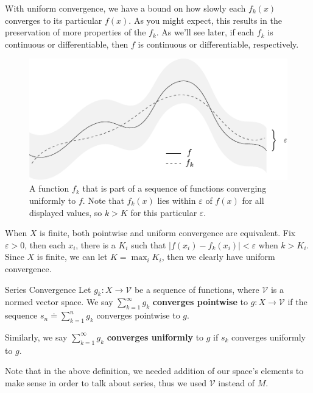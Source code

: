 \documentclass[10pt]{report}
\begin{document}
With uniform convergence, we have a bound on how slowly each $f_k(x)$ converges to its particular $f(x)$. As you might expect, this results in the preservation of more properties of the $f_k$. As we'll see later, if each $f_k$ is continuous or differentiable, then $f$ is continuous or differentiable, respectively.

\begin{figure}[H]
	\centering
	\includegraphics[scale=1.3]{fig/uniform-convergence.pdf}
	\caption{A function $f_k$ that is part of a sequence of functions converging uniformly to $f$. Note that $f_k(x)$ lies within $\varepsilon$ of $f(x)$ for all displayed values, so $k > K$ for this particular $\varepsilon$.}
\end{figure}

\begin{note}{}{}
	When $X$ is finite, both pointwise and uniform convergence are equivalent. Fix $\varepsilon>0$, then each $x_i$, there is a $K_i$ such that $|f(x_i) - f_k(x_i) | < \varepsilon$ when $k > K_i$. Since $X$ is finite, we can let $K = \max_i K_i$, then we clearly have uniform convergence.
\end{note}

\begin{defn}{Series Convergence}{}
	Let $g_k : X \to \mathcal{V}$ be a sequence of functions, where $\mathcal{V}$ is a normed vector space. We say $\sum_{k=1}^{\infty} g_k$ \textbf{converges pointwise} to $g:X \to \mathcal{V}$ if the sequence $s_n \doteq \sum_{k=1}^{n} g_k$ converges pointwise to $g$.

	Similarly, we say $\sum_{k=1}^{\infty} g_k$ \textbf{converges uniformly} to $g$ if $s_k$ converges uniformly to $g$.
\end{defn}

Note that in the above definition, we needed addition of our space's elements to make sense in order to talk about series, thus we used $\mathcal{V}$ instead of $M$.
\end{document}
